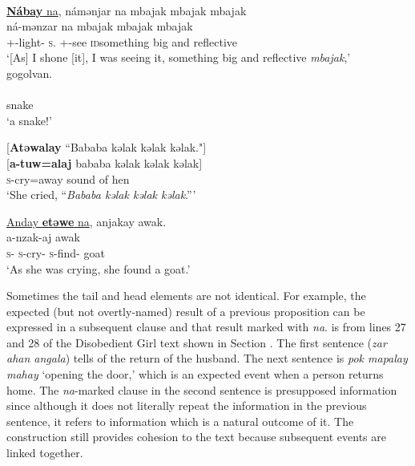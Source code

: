 \medskip
{}\\
\underline{\textbf{Nábay}  na},  námənjar  na  mbajak  mbajak  mbajak\\  
\gll  {}  ná-mənzar na {mbajak   mbajak    mbajak}\\ 
      {\oneS}+{\IFV}-light{}-{\CL}    \textsc{s}.{\DO}   {\oneS}+{\IFV}-see  {\PSP}  {\textsc{id}something big and reflective}\\   
\glt ‘[As] I shone [it], I was seeing it, something big and reflective \textit{mbajak},’\\
      
      \medskip
gogolvan.\\      
 \\
     snake\\
\glt  ‘a snake!’
\z

\ea \label{ex:11:25}
{}[\textbf{Atəwalay} “Bababa  kəlak  kəlak  kəlak."]\\  
\gll  {}[\textbf{a-tuw=alaj} {bababa  kəlak kəlak kəlak}]\\ 
      \textsc{s}-cry=away {sound of hen}\\ 
\glt ‘She cried, “\textit{Bababa kəlak  kəlak  kəlak}.”’

\medskip
\underline{Anday  \textbf{etəwe}  na},  anjakay  awak.\\
\gll {}   a-nzak-aj   awak\\
     \textsc{s}-{\PRG}  \textsc{s}-cry-{\CL}  {\PSP}  \textsc{s}-find-{\CL}  goat\\
\glt  ‘As she was crying, she found a goat.’ 
\z

\largerpage
Sometimes the tail and head elements are not identical. For example, the expected (but not overtly-named) result of a previous proposition can be expressed in a subsequent clause and that result marked with \textit{na}.  is from lines 27 and 28 of the Disobedient Girl text shown in Section . The first sentence (\textit{zar ahan angala}) tells of the return of the husband. The next sentence is \textit{pok mapalay mahay} ‘opening the door,’ which is an expected event when a person returns home. The \textit{na}{}-marked clause in the second sentence is presupposed information since although it does not literally repeat the information in the previous sentence, it refers to information which is a natural outcome of it. The construction still provides cohesion to the text because subsequent events are linked together. 

